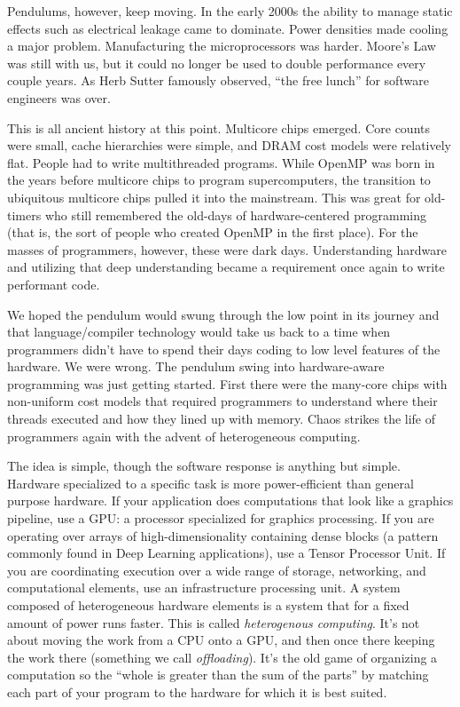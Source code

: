 Pendulums, however, keep moving.  In the early 2000s the ability to manage static effects such as electrical
leakage came to dominate.   Power densities made cooling a major problem.  Manufacturing the microprocessors was harder. Moore's Law was 
still with us, but it could no longer be used to double performance every couple years.
As Herb Sutter famously observed, ``the free lunch'' for software engineers was over. 

This is all ancient history at this point.  Multicore chips emerged.  Core counts were small, cache hierarchies were 
simple, and DRAM cost models were relatively flat.   People had to write multithreaded programs.   While OpenMP
was born in the years before multicore chips to program supercomputers,
the transition to ubiquitous multicore chips pulled it into the mainstream.  This was great for 
old-timers who still remembered the old-days of hardware-centered programming (that is, the sort of people 
who created OpenMP in the first place). For the masses of programmers, however, these were dark days.
Understanding hardware and utilizing that deep understanding became a requirement once again to write performant code.

We hoped the pendulum would swung through the low point in its journey and that language/compiler technology
would take us back to a time when programmers didn't have to spend their days coding to low level features of the
hardware.  We were wrong.  The pendulum swing into hardware-aware programming was just getting started.
First there were the many-core chips with non-uniform cost models that required programmers to understand
where their threads executed and how they lined up with memory.  Chaos strikes the life of programmers again with
the advent of heterogeneous computing.

The idea is simple, though the software response is anything but simple.  Hardware specialized to a specific task is
more power-efficient than general purpose hardware.   If your application does computations that look like a graphics pipeline, 
use a GPU: a processor specialized for graphics processing.  If you are operating over arrays of high-dimensionality containing dense blocks
(a pattern commonly found in Deep Learning applications), use a Tensor Processor Unit.  If
you are coordinating execution over a wide range of storage, networking, and computational elements, use an infrastructure
processing unit. A system composed of heterogeneous hardware elements is a system that for a fixed amount of power runs faster.
This is called \emph{heterogenous computing}.   It's not about moving the work from a CPU onto a GPU, and then once there 
keeping the work there (something we call \emph{offloading}).   It's the old game of organizing a computation 
so the ``whole is greater than the sum of the parts'' by matching each part of your program to the hardware for which it is best suited.

